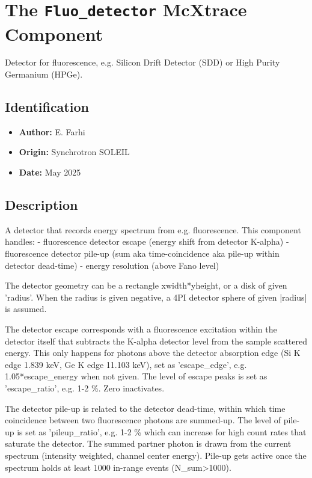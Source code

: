 \section{The \texttt{Fluo\_detector} McXtrace Component}
Detector for fluorescence, e.g. Silicon Drift Detector (SDD) or High Purity Germanium (HPGe).

\subsection*{Identification}
\begin{itemize}
  \item \textbf{Author:} E. Farhi
  \item \textbf{Origin:} Synchrotron SOLEIL
  \item \textbf{Date:} May 2025
\end{itemize}

\subsection*{Description}
A detector that records energy spectrum from e.g. fluorescence. This component handles: - fluorescence detector escape (energy shift from detector K-alpha) - fluorescence detector pile-up (sum aka time-coincidence aka pile-up within detector dead-time) - energy resolution (above Fano level)

The detector geometry can be a rectangle xwidth*yheight, or a disk of given 'radius'. When the radius is given negative, a 4PI detector sphere of given |radius| is assumed.

The detector escape corresponds with a fluorescence excitation within the detector itself that subtracts the K-alpha detector level from the sample scattered energy. This only happens for photons above the detector absorption edge (Si K edge 1.839 keV, Ge K edge 11.103 keV), set as 'escape\_edge', e.g. 1.05*escape\_energy when not given. The level of escape peaks is set as 'escape\_ratio', e.g. 1-2 \%. Zero inactivates.

The detector pile-up is related to the detector dead-time, within which time coincidence between two fluorescence photons are summed-up. The level of pile-up is set as 'pileup\_ratio', e.g. 1-2 \% which can increase for high count rates that saturate the detector. The summed partner photon is drawn from the current spectrum (intensity weighted, channel center energy). Pile-up gets active once the spectrum holds at least 1000 in-range events (N\_sum\textgreater{}1000).

